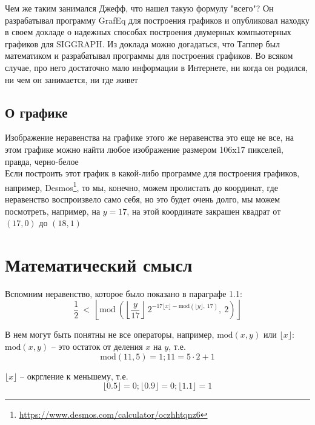 \documentclass[a4paper,12pt]{article}
\begin{document}
Чем же таким занимался Джефф, что нашел такую формулу "всего"? Он разрабатывал программу GrafEq для построения графиков и опубликовал находку в своем докладе о надежных способах построения двумерных компьютерных графиков для SIGGRAPH. Из доклада можно догадаться, что Таппер был математиком и разрабатывал программы для построения графиков. Во всяком случае, про него достаточно мало информации в Интернете, ни когда он родился, ни чем он занимается, ни где живет\\

\subsection{О графике}
Изображение неравенства на графике этого же неравенства это еще не все, на этом графике можно найти любое изображение размером 106x17 пикселей, правда, черно-белое\\

Если построить этот график в какой-либо программе для построения графиков, например, Desmos\footnote{\url{https://www.desmos.com/calculator/oczhhtqnz6}}, то мы, конечно, можем пролистать до координат, где неравенство воспроизвело само себя, но это будет очень долго, мы можем посмотреть, например, на $y=17$, на этой координате закрашен квадрат от $(17, 0)$ до $(18, 1)$\\

\section{Математический смысл}
Вспомним неравенство, которое было показано в параграфе 1.1:
\begin{equation}\label{eq:tupper}
  \frac{1}{2} \: < \: \left\lfloor \mathrm{mod}\: \left( \left\lfloor \frac{y}{17} \right\rfloor \: 2^{-17 \lfloor x \rfloor - \mathrm{mod} \left( \lfloor y \rfloor, \: 17 \right)} ,\: 2 \right) \right\rfloor
\end{equation}

В нем могут быть понятны не все операторы, например, $\mathrm{mod}(x, y)$ или $\lfloor x \rfloor$:\\

$\mathrm{mod}(x, y)$ -- это остаток от деления $x$ на $y$, т.е.
\begin{equation}
  \mathrm{mod}(11, 5) = 1; 11=5\cdot2+1
\end{equation}

$\lfloor x \rfloor$ -- окргление к меньшему, т.е.
\begin{equation}
  \lfloor 0.5 \rfloor=0;
  \lfloor 0.9 \rfloor=0;
  \lfloor 1.1 \rfloor=1
\end{equation}
\end{document}
